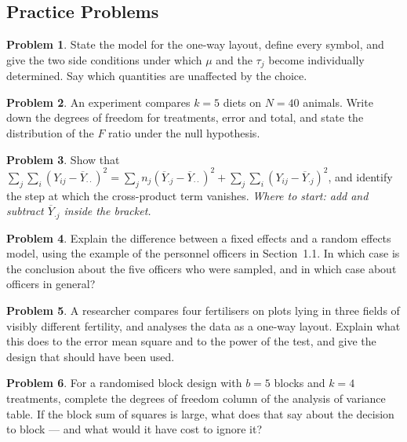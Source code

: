 \documentclass[11pt,a4paper]{article}
\theoremstyle{definition}
\newtheorem{problemx}{Problem}[section]
\newenvironment{problem}{\begin{problemx}}{\end{problemx}}
\begin{document}
\subsection{Practice Problems}

\begin{problem}
State the model for the one-way layout, define every symbol, and give the two
side conditions under which $\mu$ and the $\tau_j$ become individually
determined. Say which quantities are unaffected by the choice.
\end{problem}

\begin{problem}
An experiment compares $k=5$ diets on $N=40$ animals. Write down the degrees of
freedom for treatments, error and total, and state the distribution of the $F$
ratio under the null hypothesis.
\end{problem}

\begin{problem}
Show that $\sum_{j}\sum_{i}\left(Y_{ij}-\overline{Y}_{\cdot\cdot}\right)^2
=\sum_{j}n_j\left(\overline{Y}_{\cdot j}-\overline{Y}_{\cdot\cdot}\right)^2
+\sum_{j}\sum_{i}\left(Y_{ij}-\overline{Y}_{\cdot j}\right)^2$,
and identify the step at which the cross-product term vanishes.
\emph{Where to start: add and subtract $\overline{Y}_{\cdot j}$ inside the
bracket.}
\end{problem}

\begin{problem}
Explain the difference between a fixed effects and a random effects model,
using the example of the personnel officers in Section~1.1. In which case is
the conclusion about the five officers who were sampled, and in which case
about officers in general?
\end{problem}

\begin{problem}
A researcher compares four fertilisers on plots lying in three fields of
visibly different fertility, and analyses the data as a one-way layout.
Explain what this does to the error mean square and to the power of the test,
and give the design that should have been used.
\end{problem}

\begin{problem}
For a randomised block design with $b=5$ blocks and $k=4$ treatments, complete
the degrees of freedom column of the analysis of variance table. If the block
sum of squares is large, what does that say about the decision to block --- and
what would it have cost to ignore it?
\end{problem}
\end{document}
